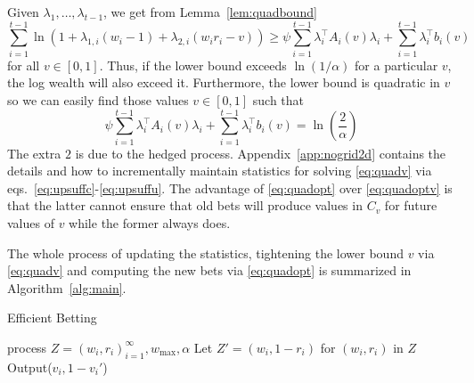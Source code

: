 Given $\lambda_1,\ldots,\lambda_{t-1}$, we get from Lemma~\ref{lem:quadbound} 
\[
\sum_{i=1}^{t-1} \ln(1+\lambda_{1,i} (w_i-1)+\lambda_{2,i} (w_i r_i - v)) 
\geq
\psi  
 \sum_{i=1}^{t-1} \lambda_i^\top A_i(v)\lambda_i  +  \sum_{i=1}^{t-1} \lambda_i^\top b_i(v)
\]
for all $v \in [0,1]$. Thus, if the lower bound exceeds $\ln(1/\alpha)$ 
for a particular $v$, the log wealth will also exceed it. Furthermore,
the lower bound is quadratic in $v$ so we can easily find those values
$v \in [0,1]$ such that
\begin{equation}
   \psi  
 \sum_{i=1}^{t-1} \lambda_i^\top A_i(v)\lambda_i  +  \sum_{i=1}^{t-1} \lambda_i^\top b_i(v) = \ln\left(\frac{2}{\alpha}\right) 
 \label{eq:quadv}
\end{equation} 
The extra $2$ is due to the hedged process. 
Appendix~\ref{app:nogrid2d} contains the details and 
how to incrementally maintain statistics for solving
\eqref{eq:quadv} via eqs.~\eqref{eq:upsuffc}-\eqref{eq:upsuffu}.
The advantage of \eqref{eq:quadopt}
over \eqref{eq:quadoptv} is that the latter cannot 
ensure that old bets will produce values in $C_v$ for 
future values of $v$ while the former always does.

The whole process of updating the statistics,
tightening the lower bound $v$ via \eqref{eq:quadv}
and computing the new bets via \eqref{eq:quadopt}
is summarized in Algorithm~\ref{alg:main}.



\begin{algorithm}[tb]
   \caption{Efficient Betting}
   \label{alg:main}
\begin{algorithmic}
     process $Z=(w_i,r_i)_{i=1}^\infty, w_{\max}, \alpha$
    \STATE Let $Z' = (w_i,1-r_i)$ for $(w_i,r_i)$ in $Z$
        \STATE Output($v_i,1-v_i'$)
   \ENDFOR
{}
\ENDFUNCTION
\end{algorithmic}
\end{algorithm}

